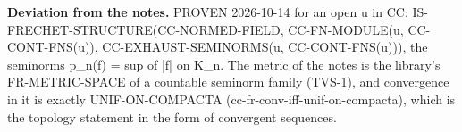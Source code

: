 %
\noindent\textbf{Deviation from the notes.} PROVEN 2026-10-14 for an open u in CC: IS-FRECHET-STRUCTURE(CC-NORMED-FIELD, CC-FN-MODULE(u, CC-CONT-FNS(u)), CC-EXHAUST-SEMINORMS(u, CC-CONT-FNS(u))), the seminorms p\_n(f) = sup of |f| on K\_n. The metric of the notes is the library's FR-METRIC-SPACE of a countable seminorm family (TVS-1), and convergence in it is exactly UNIF-ON-COMPACTA (cc-fr-conv-iff-unif-on-compacta), which is the topology statement in the form of convergent sequences.
%
\renewcommand{\thethm}{5.3}
\begin{prop}[{H(U) is closed in C(U)}]\label{thm:cc-hol-fns-closed}
%
\leavevmode
{}
%
\end{prop}
%
